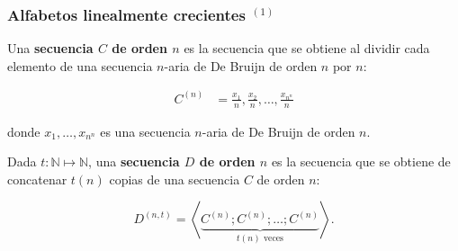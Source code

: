 \documentclass[t, 10pt, mathserif]{beamer}
\begin{document}
\begin{frame}
  \frametitle{Alfabetos linealmente crecientes {$^{(1)}$}}
  \pause

  \vspace{-0.5cm}
  \begin{definition}
    \medskip
    Una \textbf{secuencia $C$ de orden $n$} es la secuencia que se obtiene al dividir cada elemento de una secuencia $n$-aria de De Bruijn de orden $n$ por $n$:
    \pause

    \begin{equation*}
      \begin{aligned}
        C^{(n)} & = \frac{x_1}{n}, \frac{x_2}{n}, \dots, \frac{x_{n^n}}{n}
      \end{aligned}
    \end{equation*}

    \medskip
    donde $x_1, \dots, x_{n^n}$ es una secuencia $n$-aria de De Bruijn de orden $n$.
  \end{definition}
  \pause

  \begin{definition}
    \medskip
    Dada $t : \mathbb{N} \mapsto \mathbb{N}$, una \textbf{secuencia $D$ de orden $n$} es la secuencia que se obtiene de concatenar $t(n)$ copias de una secuencia $C$ de orden $n$:
    \pause

    \begin{equation*}
      D^{(n, t)} = \left< \underbrace{C^{(n)} ; C^{(n)} ; \dots ; C^{(n)}}_{t(n) \text{ veces}} \right> \text{.}
    \end{equation*}
  \end{definition}
\end{frame}

\end{document}
